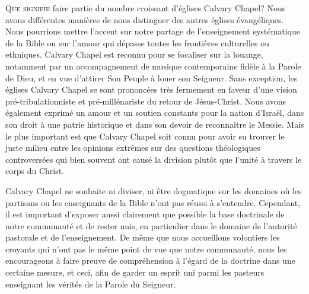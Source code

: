 
\lettrine{Q}{ue signifie} faire partie du nombre \pocketlinebreak
 croissant d'églises Calvary Chapel?
 Nous avons différentes manières de nous distinguer des autres églises évangéliques.
 Nous pourrions mettre l'accent sur notre partage de l'enseignement systématique \pocketlinebreak
 de la Bible
 ou sur l'amour qui dépasse tou\-tes les frontières culturelles ou ethniques.
Calvary Chapel est reconnu pour se focaliser sur la louange,
 notamment par un
 accompagnement de musique con\-tem\-po\-rai\-ne fidèle à la Parole de Dieu,
 et en vue d'attirer Son Peuple à louer son Seigneur.
 Sans exception, les églises Calvary Chapel se sont prononcées très fermement
 en faveur d'une vision pré-tribulationniste et pré-millénariste du retour de Jésus-Christ.
Nous avons également exprimé un amour et un soutien constants pour la nation
 d'Israël,
 dans son droit à une patrie historique  et dans son devoir de reconnaître le Messie.
 Mais le plus important est que Calvary Chapel soit connu pour avoir su trouver
 le juste milieu entre les opinions extrêmes sur des questions théologiques
 controversées qui bien souvent ont causé la division plutôt que l'unité
 à travers le corps du Christ.

Calvary Chapel ne souhaite ni diviser, ni être dogmatique sur les domaines où les partisans
 ou les enseignants de la Bible n'ont pas réussi à s'entendre.
 Cependant, il est important d'exposer aussi clairement que possible la base doctrinale
 de notre communauté et de rester unis, en particulier dans le domaine de l'autorité pastorale
 et de l'enseignement. De même que nous accueillons volontiers les croyants qui
 n'ont pas
 le même point de vue que notre communauté, nous les encourageons à 
 faire preuve de compréhension
 à l'égard de la doctrine dans une certaine mesure, et ceci, afin de garder un esprit uni
 parmi les pasteurs enseignant les vérités de la Parole du Seigneur.

